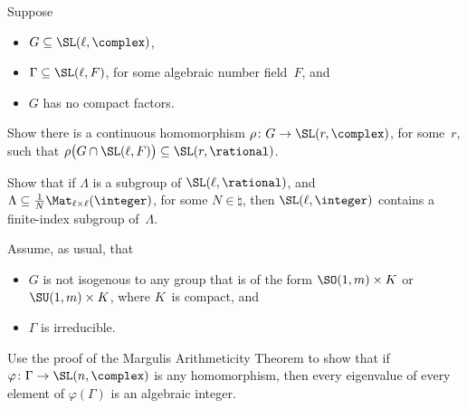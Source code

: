 \begin{exercises}

\item \label{ROSPutsGFinGQ}
Suppose 
	\begin{itemize}
	\item $G \subseteq \SL(\ell,\complex)$, 
	\item $\Gamma \subseteq \SL(\ell,F)$, for some algebraic number field~$F$,
	and
	\item $G$ has no compact factors.
	\end{itemize}
Show there is a continuous homomorphism $\rho \colon G
\to \SL(r,\complex)$, for some~$r$, such that $\rho \bigl( G \cap
\SL(\ell,F) \bigr) \subseteq \SL(r,\rational)$.

\item \label{GammaBddDenomsEx}
Show that if $\Lambda$ is a subgroup of $\SL(\ell,\rational)$, and $\Lambda \subseteq \frac{1}{N} \Mat_{\ell\times\ell}(\integer)$, for some $N \in \natural$, then $\SL(\ell,\integer)$ contains a finite-index subgroup of~$\Lambda$.


\item \label{EigenValsAreInts}
Assume, as usual, that 
	\begin{itemize}
	\item $G$ is not isogenous to any group that is of the form\/ $\SO(1,m) \times K$ or\/ $\SU(1,m) \times K$, where $K$~is compact,
	and
	\item $\Gamma$ is irreducible.
	\end{itemize}
Use the proof of the Margulis Arithmeticity Theorem to show that if $\varphi \colon \Gamma \to \SL(n,\complex)$ is any homomorphism, then every eigenvalue of every element of $\varphi(\Gamma)$ is an algebraic integer.

\end{exercises}









